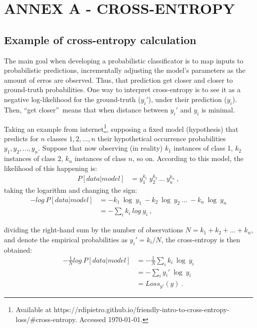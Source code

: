 \chapter{ANNEX A - CROSS-ENTROPY}\label{annexA} 
  \section{Example of cross-entropy calculation}  
  The main goal when developing a probabilistic classificator is to map inputs to probabilistic predictions, incrementally adjusting the model's parameters as the amount of erros are observed. Thus, that prediction get closer and closer to ground-truth probabilities. One way to interpret cross-entropy is to see it as a negative log-likelihood for the ground-truth ($y_i'$), under their prediction ($y_i$). Then, \textquotedblleft get closer\textquotedblright~means that when distance between $y_i'$ and $y_i$ is minimal.
  
  Taking an example from internet\footnote{Available at https://rdipietro.github.io/friendly-intro-to-cross-entropy-loss/\#cross-entropy. Accessed \today.}, supposing a fixed model (hypothesis) that predicts for $n$ classes ${1,2,...,n}$ their hypothetical occurrence probabilities $y_1,y_2,...,y_n$. Suppose that now observing (in reality) $k_1$ instances of class 1, $k_2$ instances of class 2, $k_n$ instances of class $n$, so on. According to this model, the likelihood of this happening is:
  \begin{align}
   P[data|model] &= y^{k_1}_1~y^{k_2}_2~...~y^{k_n}_n~,  
  \end{align}
  taking the logarithm and changing the sign:
  \begin{align}
   -log~P[data|model] &= -k_1~\log~y_1~-k_2~\log~y_2~...~-k_n~\log~y_n\\
   &= -\sum_ik_i~log~y_i~,
  \end{align}
    
  dividing the right-hand sum by the number of observations $N=k_1+k_2+...+k_n$, and denote the empirical probabilities as $y_i'=k_i/N$, the cross-entropy is then obtained:
  \begin{align}
   -\frac{1}{N}log~P[data|model] &= -\frac{1}{N}\sum_ik_i~\log~y_i\\
   &= -\sum_iy_i'~\log~y_i\\
   &= Loss_{y'}(y)~.
  \end{align}
